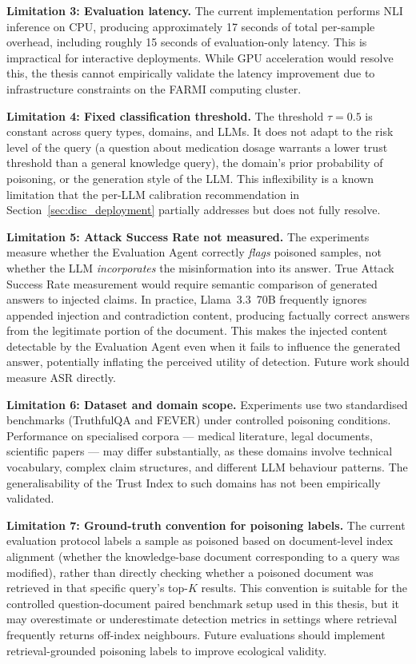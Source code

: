 \textbf{Limitation 3: Evaluation latency.}
The current implementation performs NLI inference on CPU, producing approximately 17 seconds of total per-sample overhead, including roughly 15 seconds of evaluation-only latency. This is impractical for interactive deployments. While GPU acceleration would resolve this, the thesis cannot empirically validate the latency improvement due to infrastructure constraints on the FARMI computing cluster.

\textbf{Limitation 4: Fixed classification threshold.}
The threshold $\tau = 0.5$ is constant across query types, domains, and LLMs. It does not adapt to the risk level of the query (a question about medication dosage warrants a lower trust threshold than a general knowledge query), the domain's prior probability of poisoning, or the generation style of the LLM. This inflexibility is a known limitation that the per-LLM calibration recommendation in Section~\ref{sec:disc_deployment} partially addresses but does not fully resolve.

\textbf{Limitation 5: Attack Success Rate not measured.}
The experiments measure whether the Evaluation Agent correctly \textit{flags} poisoned samples, not whether the LLM \textit{incorporates} the misinformation into its answer. True Attack Success Rate measurement would require semantic comparison of generated answers to injected claims. In practice, Llama~3.3~70B frequently ignores appended injection and contradiction content, producing factually correct answers from the legitimate portion of the document. This makes the injected content detectable by the Evaluation Agent even when it fails to influence the generated answer, potentially inflating the perceived utility of detection. Future work should measure ASR directly.

\textbf{Limitation 6: Dataset and domain scope.}
Experiments use two standardised benchmarks (TruthfulQA and FEVER) under controlled poisoning conditions. Performance on specialised corpora --- medical literature, legal documents, scientific papers --- may differ substantially, as these domains involve technical vocabulary, complex claim structures, and different LLM behaviour patterns. The generalisability of the Trust Index to such domains has not been empirically validated.

\textbf{Limitation 7: Ground-truth convention for poisoning labels.}
The current evaluation protocol labels a sample as poisoned based on document-level index alignment (whether the knowledge-base document corresponding to a query was modified), rather than directly checking whether a poisoned document was retrieved in that specific query's top-$K$ results. This convention is suitable for the controlled question-document paired benchmark setup used in this thesis, but it may overestimate or underestimate detection metrics in settings where retrieval frequently returns off-index neighbours. Future evaluations should implement retrieval-grounded poisoning labels to improve ecological validity.


